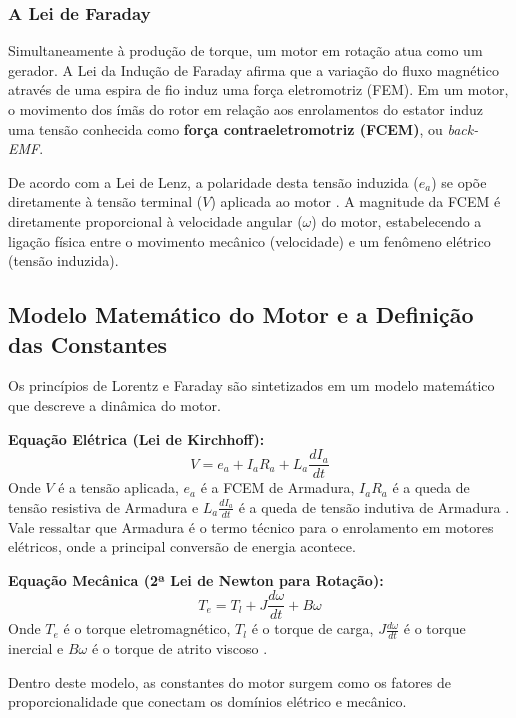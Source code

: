 \documentclass[12pt, a4paper, openright, oneside, brazilian]{abntex2}
\begin{document}
\subsubsection{A Lei de Faraday}
Simultaneamente à produção de torque, um motor em rotação atua como um gerador. A Lei da Indução de Faraday afirma que a variação do fluxo magnético através de uma espira de fio induz uma força eletromotriz (FEM). Em um motor, o movimento dos ímãs do rotor em relação aos enrolamentos do estator induz uma tensão conhecida como \textbf{força contraeletromotriz (FCEM)}, ou \textit{back-EMF}.

De acordo com a Lei de Lenz, a polaridade desta tensão induzida ($e_a$) se opõe diretamente à tensão terminal ($V$) aplicada ao motor \parencite{infineon2011bldc}. A magnitude da FCEM é diretamente proporcional à velocidade angular ($\omega$) do motor, estabelecendo a ligação física entre o movimento mecânico (velocidade) e um fenômeno elétrico (tensão induzida).

\subsection{Modelo Matemático do Motor e a Definição das Constantes}

Os princípios de Lorentz e Faraday são sintetizados em um modelo matemático que descreve a dinâmica do motor.

\textbf{Equação Elétrica (Lei de Kirchhoff):}
\begin{equation}
    V = e_a + I_a R_a + L_a \frac{dI_a}{dt}
\end{equation}
Onde $V$ é a tensão aplicada, $e_a$ é a FCEM de Armadura, $I_a R_a$ é a queda de tensão resistiva de Armadura e $L_a \frac{dI_a}{dt}$ é a queda de tensão indutiva de Armadura \parencite{maquinasEletricasFitzgerald}. Vale ressaltar que Armadura é o termo técnico para o enrolamento em motores elétricos, onde a principal conversão de energia acontece.

\textbf{Equação Mecânica (2ª Lei de Newton para Rotação):}
\begin{equation}
    T_e = T_l + J \frac{d\omega}{dt} + B\omega
\end{equation}
Onde $T_e$ é o torque eletromagnético, $T_l$ é o torque de carga, $J\frac{d\omega}{dt}$ é o torque inercial e $B\omega$ é o torque de atrito viscoso \parencite{maquinasEletricasFitzgerald}.

Dentro deste modelo, as constantes do motor surgem como os fatores de proporcionalidade que conectam os domínios elétrico e mecânico.
\end{document}
